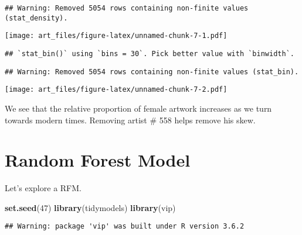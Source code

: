 \documentclass[]{article}
\newenvironment{Shaded}{\begin{snugshade}}{\end{snugshade}}
\newcommand{\CommentTok}[1]{\textcolor[rgb]{0.56,0.35,0.01}{\textit{#1}}}
\newcommand{\DataTypeTok}[1]{\textcolor[rgb]{0.13,0.29,0.53}{#1}}
\newcommand{\DecValTok}[1]{\textcolor[rgb]{0.00,0.00,0.81}{#1}}
\newcommand{\KeywordTok}[1]{\textcolor[rgb]{0.13,0.29,0.53}{\textbf{#1}}}
\newcommand{\NormalTok}[1]{#1}
\newcommand{\OperatorTok}[1]{\textcolor[rgb]{0.81,0.36,0.00}{\textbf{#1}}}
\newcommand{\StringTok}[1]{\textcolor[rgb]{0.31,0.60,0.02}{#1}}
\begin{document}
\begin{verbatim}
## Warning: Removed 5054 rows containing non-finite values (stat_density).
\end{verbatim}

\texttt{[image: art\_files/figure-latex/unnamed-chunk-7-1.pdf]}

\begin{Shaded}
\end{Shaded}

\begin{verbatim}
## `stat_bin()` using `bins = 30`. Pick better value with `binwidth`.
\end{verbatim}

\begin{verbatim}
## Warning: Removed 5054 rows containing non-finite values (stat_bin).
\end{verbatim}

\texttt{[image: art\_files/figure-latex/unnamed-chunk-7-2.pdf]}

We see that the relative proportion of female artwork increases as we
turn towards modern times. Removing artist \# 558 helps remove his skew.

\hypertarget{random-forest-model}{%
\section{Random Forest Model}\label{random-forest-model}}

Let's explore a RFM.

\begin{Shaded}
\begin{Highlighting}[]
\KeywordTok{set.seed}\NormalTok{(}\DecValTok{47}\NormalTok{)}
\KeywordTok{library}\NormalTok{(tidymodels)}
\KeywordTok{library}\NormalTok{(vip)}
\end{Highlighting}
\end{Shaded}

\begin{verbatim}
## Warning: package 'vip' was built under R version 3.6.2
\end{verbatim}
\end{document}
